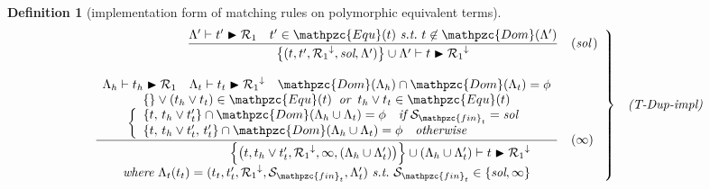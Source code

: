 \documentclass[12pt]{article}
\newtheorem{Definition}{Definition}[section]
\begin{document}
\begin{Definition}[implementation form of matching rules on
    polymorphic equivalent terms]
\begin{displaymath}
\begin{array}{c}
      \begin{array}{rl}
        \left. \begin{array}{rl}
          \dfrac{
            \Lambda' \vdash t' \blacktriangleright \mathcal{R}_1 \quad
             t' \in \mathpzc{Equ}(t)\ \text{\it s.t.}\ t \not\in
              \mathpzc{Dom}(\Lambda')
          }{
            \bigl\{(t, t', {\mathcal{R}_1}^\downarrow, \text{\it sol},
             \Lambda') \bigr\} \cup \Lambda' \vdash
              t \blacktriangleright {\mathcal{R}_1}^\downarrow
          }  &  (\text{\it sol}\,)  \\
          \\
          
          \dfrac{
            \begin{array}{c}
              \Lambda_h \vdash t_h \blacktriangleright \mathcal{R}_1
               \quad \Lambda_t \vdash t_t \blacktriangleright
                {\mathcal{R}_1}^\downarrow
                 \quad \mathpzc{Dom}(\Lambda_h) \cap \mathpzc{Dom}(\Lambda_t)
                  = \phi  \\
              \{\} \vee (t_h \vee t_t) \in \mathpzc{Equ}(t)\;\;
               \text{\it or}\;\; t_h \vee t_t \in \mathpzc{Equ}(t)  \\
              \left\{\begin{array}{l}
                \{t,\, t_h \vee t'_t \} \cap \mathpzc{Dom}(
                 \Lambda_h \cup \Lambda_t) = \phi\quad \text{\it if}\
                  \mathcal{S}_{\mathpzc{fin}_t} = \text{\it sol}  \\
                \{t,\, t_h \vee t'_t,\, t'_t \} \cap \mathpzc{Dom}(
                 \Lambda_h \cup \Lambda_t) = \phi\quad \text{\it otherwise}
              \end{array}\right.
            \end{array}
          }{
            \begin{array}{r}
              \Bigl\{\bigl(t, t_h \vee t_t', {\mathcal{R}_1}^\downarrow,
               \infty, (\Lambda_h \cup \Lambda_t') \bigr) \Bigr\} \cup
                (\Lambda_h \cup \Lambda_t') \vdash
                 t \blacktriangleright {\mathcal{R}_1}^\downarrow  \\
              \text{\it where}\
               \Lambda_t(t_t) = (t_t, t_t', {\mathcal{R}_1}^\downarrow,
                \mathcal{S}_{\mathpzc{fin}_t}, \Lambda_t')\ \text{\it s.t.}\
                 \mathcal{S}_{\mathpzc{fin}_t} \in \{\text{\it sol}, \infty\}
            \end{array}
          }  &  (\infty)
        \end{array} \right\}  &  \text{\it (T-Dup-impl)}
      \end{array}  \\
      \\
      

\end{array}
\end{displaymath}
\end{Definition}
\end{document}
